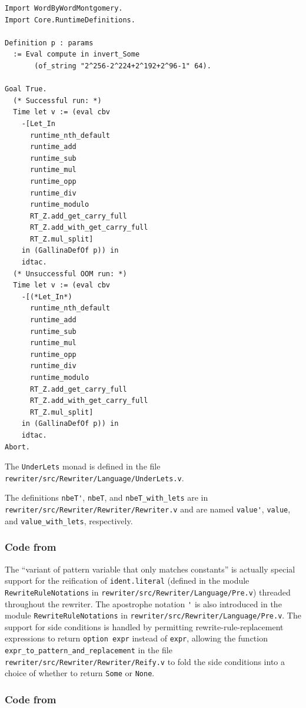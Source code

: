 \begin{subappendices}
\begin{verbatim}
Import WordByWordMontgomery.
Import Core.RuntimeDefinitions.

Definition p : params
  := Eval compute in invert_Some
       (of_string "2^256-2^224+2^192+2^96-1" 64).

Goal True.
  (* Successful run: *)
  Time let v := (eval cbv
    -[Let_In
      runtime_nth_default
      runtime_add
      runtime_sub
      runtime_mul
      runtime_opp
      runtime_div
      runtime_modulo
      RT_Z.add_get_carry_full
      RT_Z.add_with_get_carry_full
      RT_Z.mul_split]
    in (GallinaDefOf p)) in
    idtac.
  (* Unsuccessful OOM run: *)
  Time let v := (eval cbv
    -[(*Let_In*)
      runtime_nth_default
      runtime_add
      runtime_sub
      runtime_mul
      runtime_opp
      runtime_div
      runtime_modulo
      RT_Z.add_get_carry_full
      RT_Z.add_with_get_carry_full
      RT_Z.mul_split]
    in (GallinaDefOf p)) in
    idtac.
Abort.
\end{verbatim}

The \verb|UnderLets| monad is defined in the file \texttt{rewriter/src/Rewriter/Language/UnderLets.v}.

The definitions \verb|nbeT'|, \verb|nbeT|, and \verb|nbeT_with_lets| are in \texttt{rewriter/src/Rewriter/Rewriter/Rewriter.v} and are named \verb|value'|, \verb|value|, and \verb|value_with_lets|, respectively.

\subsubsection{Code from }

The ``variant of pattern variable that only matches constants'' is actually special support for the reification of \verb|ident.literal| (defined in the module \verb|RewriteRuleNotations| in \texttt{rewriter/src/Rewriter/Language/Pre.v}) threaded throughout the rewriter.
The apostrophe notation \verb|'| is also introduced in the module \verb|RewriteRuleNotations| in \texttt{rewriter/src/Rewriter/Language/Pre.v}.
The support for side conditions is handled by permitting rewrite-rule-replacement expressions to return \verb|option expr| instead of \verb|expr|, allowing the function \verb|expr_to_pattern_and_replacement| in the file \texttt{rewriter/src/Rewriter/Rewriter/Reify.v} to fold the side conditions into a choice of whether to return \verb|Some| or \verb|None|.

\subsubsection{Code from }


\end{subappendices}
